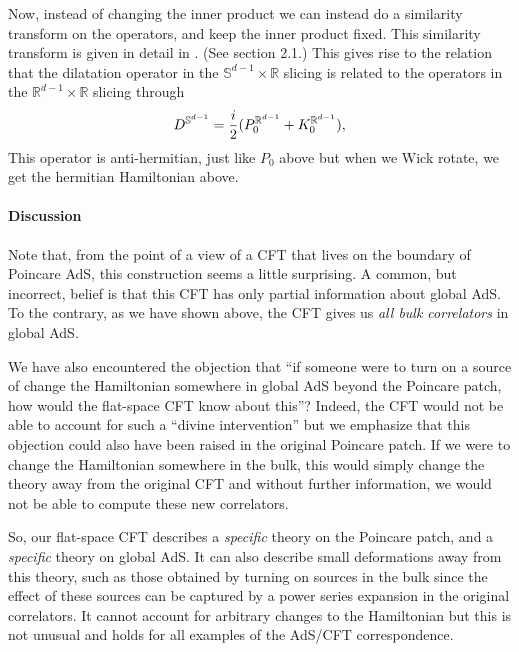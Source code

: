 Now, instead of changing the inner product we can instead do a 
similarity transform on the operators, and keep the inner product fixed. This similarity transform is given in detail in \cite{Minwalla:1997ka}. (See section 2.1.) This gives rise to the relation that the dilatation operator in the ${\mathbb S}^{d-1} \times {\mathbb R}$ slicing is related to the operators in the ${\mathbb R}^{d-1} \times {\mathbb R}$ slicing through
\[
D^{{\mathbb S}^{d-1}} = {i \over 2} (P_0^{{\mathbb R}^{d-1}} + K_0^{{\mathbb R}^{d-1}}),
 \]
This operator is anti-hermitian, just like $P_0$ above but when we Wick rotate, we get the hermitian Hamiltonian above. 



 
\paragraph{Discussion}
Note that, from the point of a view of a CFT that lives on the boundary of Poincare AdS, this construction seems a little surprising. A common, but incorrect, belief
is that this CFT has only partial information about global AdS. To the contrary, as we have shown above, the CFT gives us {\em all bulk correlators} in global AdS. 

We have also encountered the objection that ``if someone were to turn on a source of change the Hamiltonian somewhere in global AdS beyond the Poincare patch, how would 
the flat-space CFT know about this''?  Indeed, the CFT would not be
able to account for such a ``divine intervention'' but we emphasize
that this objection could also have been raised in the original
Poincare patch. If we were to change the Hamiltonian somewhere in the bulk, this would simply change the theory away from the original CFT and without further information, we would not be able to compute these new correlators. 
  
So, our flat-space CFT describes a {\em specific} theory on the Poincare patch, and a {\em specific} theory on global AdS. It can also describe small deformations away from this theory, such as those obtained by turning on sources in the bulk since the effect of these sources can be captured by a power series expansion in the original correlators. It cannot account for arbitrary changes to the Hamiltonian but this is not unusual and holds for all examples of the AdS/CFT correspondence.
 
